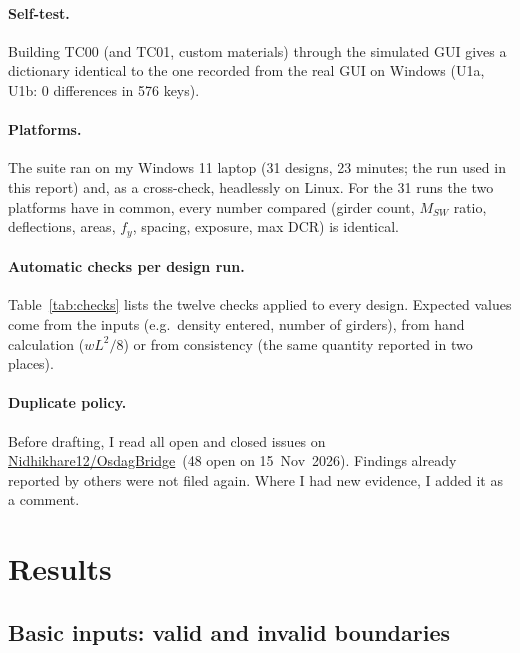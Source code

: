 \documentclass[11pt,a4paper]{article}
\newcommand{\pass}{\textcolor{ok}{\textbf{PASS}}}
\newcommand{\upstream}{\href{https://github.com/Nidhikhare12/OsdagBridge}{Nidhikhare12/OsdagBridge}}
\begin{document}
\paragraph{Self-test.} Building TC00 (and TC01, custom materials) through the simulated GUI gives a dictionary identical to the one recorded from the real GUI on Windows (U1a, U1b: 0 differences in 576 keys).

\paragraph{Platforms.} The suite ran on my Windows 11 laptop (31 designs, 23 minutes; the run used in this report) and, as a cross-check, headlessly on Linux. For the 31 runs the two platforms have in common, every number compared (girder count, $M_{SW}$ ratio, deflections, areas, $f_y$, spacing, exposure, max DCR) is identical.

\paragraph{Automatic checks per design run.} Table~\ref{tab:checks} lists the twelve checks applied to every design. Expected values come from the inputs (e.g.\ density entered, number of girders), from hand calculation ($wL^2/8$) or from consistency (the same quantity reported in two places).

\begin{table}[H]\centering\small
\caption{Automatic checks applied to every design run and how often they passed. The last column links the issue that explains each failure.}\label{tab:checks}

\end{table}

\paragraph{Duplicate policy.} Before drafting, I read all open and closed issues on \upstream\ (48 open on 15~Nov~2026). Findings already reported by others were not filed again. Where I had new evidence, I added it as a comment.

\section{Results}\label{sec:results}
\subsection{Basic inputs: valid and invalid boundaries}
\begin{table}[H]\centering\small
\caption{Homepage hard validation (U5), typed into the real input fields. All 15 cases behave as specified: \pass.}

\end{table}
\end{document}
